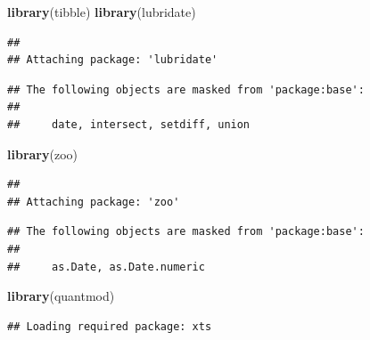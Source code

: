 \documentclass[
]{book}
\newenvironment{Shaded}{\begin{snugshade}}{\end{snugshade}}
\newcommand{\FunctionTok}[1]{\textcolor[rgb]{0.13,0.29,0.53}{\textbf{#1}}}
\newcommand{\NormalTok}[1]{#1}
\begin{document}
\begin{Shaded}
\begin{Highlighting}[]
\FunctionTok{library}\NormalTok{(tibble)}
\FunctionTok{library}\NormalTok{(lubridate)}
\end{Highlighting}
\end{Shaded}

\begin{verbatim}
## 
## Attaching package: 'lubridate'
\end{verbatim}

\begin{verbatim}
## The following objects are masked from 'package:base':
## 
##     date, intersect, setdiff, union
\end{verbatim}

\begin{Shaded}
\begin{Highlighting}[]
\FunctionTok{library}\NormalTok{(zoo)}
\end{Highlighting}
\end{Shaded}

\begin{verbatim}
## 
## Attaching package: 'zoo'
\end{verbatim}

\begin{verbatim}
## The following objects are masked from 'package:base':
## 
##     as.Date, as.Date.numeric
\end{verbatim}

\begin{Shaded}
\begin{Highlighting}[]
\FunctionTok{library}\NormalTok{(quantmod)}
\end{Highlighting}
\end{Shaded}

\begin{verbatim}
## Loading required package: xts
\end{verbatim}
\end{document}
